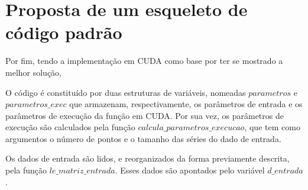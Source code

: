 \chapter{Proposta de um esqueleto de código padrão}

Por fim, tendo a implementação em CUDA como base por ter se mostrado a melhor solução, 

O código é constituído por duas estruturas de variáveis, nomeadas $parametros$ e $parametros\_exec$ que armazenam, respectivamente, os parâmetros de entrada e os parâmetros de execução da função em CUDA. Por sua vez, os parâmetros de execução são calculados pela função $calcula\_parametros\_execucao$, que tem como argumentos o número de pontos e o tamanho das séries do dado de entrada.

Os dados de entrada são lidos, e reorganizados da forma previamente descrita, pela função $le\_matriz\_entrada$. Esses dados são apontados pelo variável $d\_entrada$.





